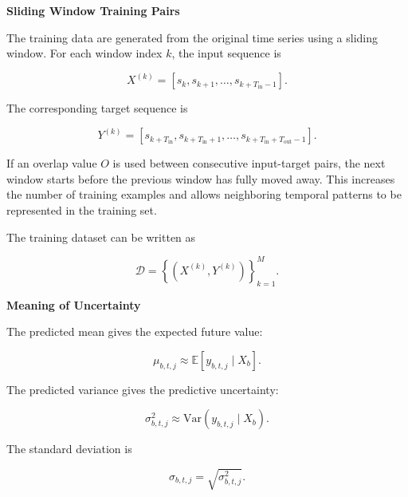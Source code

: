 \documentclass{book}
\providecommand{\ProjectDeepHeading}[2]{%
    \par\medskip\noindent\textbf{#2}\par\smallskip
}
\begin{document}
    
    \ProjectDeepHeading{8}{Sliding Window Training Pairs}
        
        The training data are generated from the original time series using a sliding window. For each window index \(k\), the input sequence is
        
        \[
            X^{(k)}
            =
            \left[
                s_k,
                s_{k+1},
                \ldots,
            s_{k+T_{\mathrm{in}}-1}
            \right].
        \]
        
        The corresponding target sequence is
        
        \[
            Y^{(k)}
            =
            \left[
                s_{k+T_{\mathrm{in}}},
            s_{k+T_{\mathrm{in}}+1},
                \ldots,
            s_{k+T_{\mathrm{in}}+T_{\mathrm{out}}-1}
            \right].
        \]
        
        If an overlap value \(O\) is used between consecutive input-target pairs, the next window starts before the previous window has fully moved away. This increases the number of training examples and allows neighboring temporal patterns to be represented in the training set.
        
        The training dataset can be written as
        
        \[
            \mathcal{D}
            =
            \left\{
                \left(
                    X^{(k)},
                Y^{(k)}
                \right)
            \right\}_{k=1}^{M}.
        \]
    
    
    \ProjectDeepHeading{8}{Meaning of Uncertainty}
        
        The predicted mean gives the expected future value:
        
        \[
            \ensuremath{\mu}_{b,t,j}
            \approx
            \mathbb{E}
            \left[
                y_{b,t,j}
                \mid
                X_b
            \right].
        \]
        
        The predicted variance gives the predictive uncertainty:
        
        \[
            \ensuremath{\sigma}^2_{b,t,j}
            \approx
            \mathrm{Var}
            \left(
                y_{b,t,j}
                \mid
                X_b
            \right).
        \]
        
        The standard deviation is
        
        \[
            \ensuremath{\sigma}_{b,t,j}
            =
            \sqrt{
                \ensuremath{\sigma}^2_{b,t,j}
            }.
        \]
        
\end{document}
